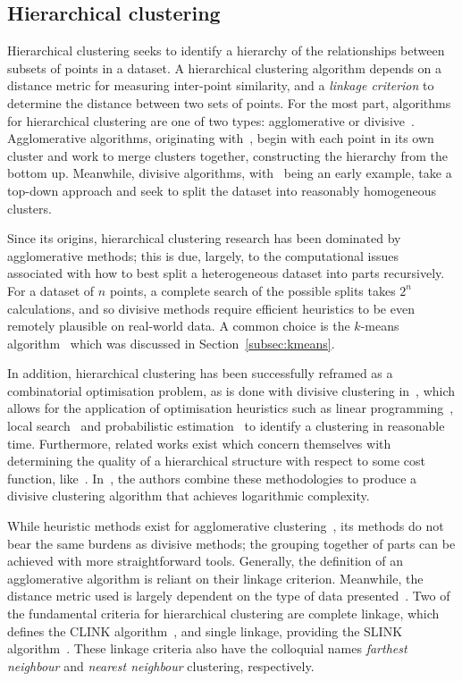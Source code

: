 \subsection{Hierarchical clustering}

Hierarchical clustering seeks to identify a hierarchy of the relationships
between subsets of points in a dataset. A hierarchical clustering algorithm
depends on a distance metric for measuring inter-point similarity, and a
\emph{linkage criterion} to determine the distance between two sets of points.
For the most part, algorithms for hierarchical clustering are one of two types:
agglomerative or divisive~\cite{Kaufman1990}. Agglomerative algorithms,
originating with~\cite{Johnson1967,Ward1963}, begin with each point in its own
cluster and work to merge clusters together, constructing the hierarchy from the
bottom up. Meanwhile, divisive algorithms, with~\cite{Edwards1965} being an
early example, take a top-down approach and seek to split the dataset into
reasonably homogeneous clusters.

Since its origins, hierarchical clustering research has been dominated by
agglomerative methods; this is due, largely, to the computational issues
associated with how to best split a heterogeneous dataset into parts
recursively. For a dataset of \(n\) points, a complete search of the possible
splits takes \(2^n\) calculations, and so divisive methods require efficient
heuristics to be even remotely plausible on real-world data. A common choice is
the \(k\)-means algorithm~\cite{Moseley2017,Peterson2018} which was discussed in
Section~\ref{subsec:kmeans}.

In addition, hierarchical clustering has been successfully reframed as a
combinatorial optimisation problem, as is done with divisive clustering
in~\cite{Dasgupta2016}, which allows for the application of optimisation
heuristics such as linear programming~\cite{Roy2017}, local
search~\cite{Aljarah2019} and probabilistic estimation~\cite{Fan2015} to
identify a clustering in reasonable time. Furthermore, related works exist which
concern themselves with determining the quality of a hierarchical structure with
respect to some cost function, like~\cite{Bilu2012,Lyzinski2017}.
In~\cite{CohenAddad2018}, the authors combine these methodologies to produce a
divisive clustering algorithm that achieves logarithmic complexity.

While heuristic methods exist for agglomerative
clustering~\cite{Aljarah2019,Fan2015}, its methods do not bear the same burdens
as divisive methods; the grouping together of parts can be achieved with more
straightforward tools. Generally, the definition of an agglomerative algorithm
is reliant on their linkage criterion. Meanwhile, the distance metric used is
largely dependent on the type of data presented~\cite{Nielsen2016}. Two of the
fundamental criteria for hierarchical clustering are complete linkage, which
defines the CLINK algorithm~\cite{Defays1977}, and single linkage, providing the
SLINK algorithm~\cite{Sibson1973}. These linkage criteria also have the
colloquial names \emph{farthest neighbour} and \emph{nearest neighbour}
clustering, respectively.

